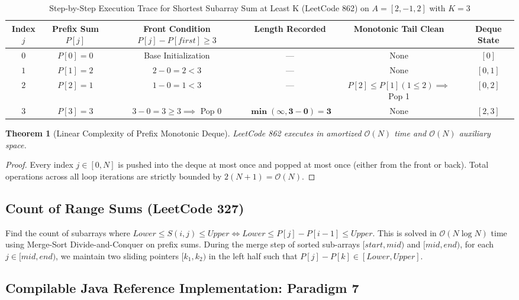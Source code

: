 \documentclass[10pt,journal,compsoc,onecolumn]{IEEEtran}
\newtheorem{theorem}{Theorem}
\begin{document}
\begin{table}[htbp]
\caption{Step-by-Step Execution Trace for Shortest Subarray Sum at Least K (LeetCode 862) on $A = [2, -1, 2]$ with $K = 3$}
\label{tab:trace_lc862}
\centering
\begin{tabular}{cccccc}
\toprule
\textbf{Index $j$} & \textbf{Prefix Sum $P[j]$} & \textbf{Front Condition $P[j] - P[first] \ge 3$} & \textbf{Length Recorded} & \textbf{Monotonic Tail Clean} & \textbf{Deque State} \\
\midrule
$0$ & $P[0] = 0$ & Base Initialization & --- & None & $[0]$ \\
$1$ & $P[1] = 2$ & $2 - 0 = 2 < 3$ & --- & None & $[0, 1]$ \\
$2$ & $P[2] = 1$ & $1 - 0 = 1 < 3$ & --- & $P[2] \le P[1] (1 \le 2) \implies$ Pop 1 & $[0, 2]$ \\
$3$ & $P[3] = 3$ & $3 - 0 = 3 \ge 3 \implies$ Pop 0 & $\mathbf{\min(\infty, 3 - 0) = 3}$ & None & $[2, 3]$ \\
\bottomrule
\end{tabular}
\end{table}

\begin{theorem}[Linear Complexity of Prefix Monotonic Deque]
LeetCode 862 executes in amortized $\mathcal{O}(N)$ time and $\mathcal{O}(N)$ auxiliary space.
\end{theorem}
\begin{proof}
Every index $j \in [0, N]$ is pushed into the deque at most once and popped at most once (either from the front or back). Total operations across all loop iterations are strictly bounded by $2(N + 1) = \mathcal{O}(N)$.
\end{proof}

\subsection{Count of Range Sums (LeetCode 327)}
Find the count of subarrays where $Lower \le S(i, j) \le Upper \iff Lower \le P[j] - P[i-1] \le Upper$.
This is solved in $\mathcal{O}(N \log N)$ time using Merge-Sort Divide-and-Conquer on prefix sums. During the merge step of sorted sub-arrays $[start, mid)$ and $[mid, end)$, for each $j \in [mid, end)$, we maintain two sliding pointers $[k_1, k_2)$ in the left half such that $P[j] - P[k] \in [Lower, Upper]$.

\subsection{Compilable Java Reference Implementation: Paradigm 7}
\end{document}

